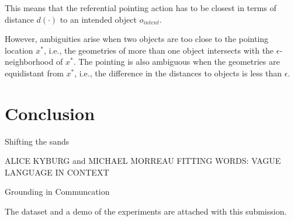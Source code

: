 This means that the referential pointing action has to be closest in terms of distance $d(\cdot)$ to an intended object $o_{intent}$. 

However, ambiguities arise when two objects are too close to the pointing location $x^*$, i.e., the geometries of more than one object intersects with the $\epsilon$-neighborhood of $x^*$. The pointing is also ambiguous when the geometries are equidistant from $x^*$, i.e., the difference in the distances to objects is less than $\epsilon$.  


\section{Conclusion}
\label{conclusion}

Shifting the sands \cite{graff2000shifting}


 ALICE KYBURG and MICHAEL MORREAU
FITTING WORDS: VAGUE LANGUAGE IN CONTEXT \cite{kyburg2000fitting}

Grounding in Communcation \cite{clark1991grounding}

The dataset and a demo of the experiments are attached with this submission.